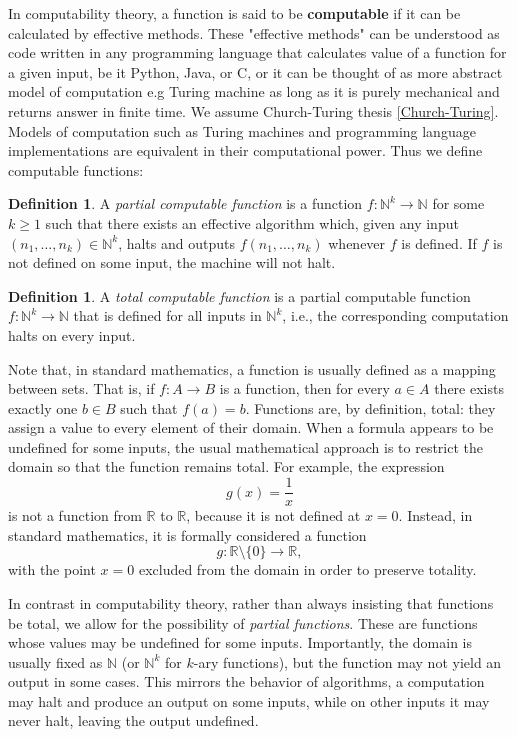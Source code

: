 \documentclass{pracalicmgr2025}
\theoremstyle{plain}            %
\theoremstyle{remark}           %
\theoremstyle{definition}       %
\newtheorem{definition}[theorem]{Definition}
\begin{document}
In computability theory, a function is said to be \textbf{computable} if it can be calculated by effective methods. These "effective methods" can be understood as code written in any programming language that calculates value of a function for a given input, be it Python, Java, or C, or it can be thought of as more abstract model of computation e.g Turing machine as long as it is purely mechanical and returns answer in finite time. We assume Church-Turing thesis \ref{Church-Turing}.  Models of computation such as Turing machines and programming language implementations are equivalent in their computational power. Thus we define computable functions:
\begin{definition}
    A \textit{partial computable function} is a function $f: \mathbb{N}^k \to \mathbb{N}$ for some $k \ge 1$ such that there exists an effective algorithm which, given any input $(n_1, \dots, n_k) \in \mathbb{N}^k$, halts and outputs $f(n_1, \dots, n_k)$ whenever $f$ is defined. If $f$ is not defined on some input, the machine will not halt.
\end{definition}
\begin{definition}
    A\textit{ total computable function} is a partial computable function $f: \mathbb{N}^k \to \mathbb{N}$ that is defined for all inputs in $\mathbb{N}^k$, i.e., the corresponding computation halts on every input.
\end{definition}

Note that, in standard mathematics, a function is usually defined as a mapping between sets. That is, if $f: A \to B$ is a function, then for every $a \in A$ there exists exactly one $b \in B$ such that $f(a) = b$. Functions are, by definition, total: they assign a value to every element of their domain. When a formula appears to be undefined for some inputs, the usual mathematical approach is to restrict the domain so that the function remains total. For example, the expression
$$
g(x) = \frac{1}{x}
$$
is not a function from $\mathbb{R}$ to $\mathbb{R}$, because it is not defined at $x = 0$. Instead, in standard mathematics, it is formally considered a function
$$
g: \mathbb{R} \setminus \{0\} \to \mathbb{R},
$$
with the point $x = 0$ excluded from the domain in order to preserve totality.

 In contrast in computability theory, rather than always insisting that functions be total, we allow for the possibility of \emph{partial functions}. These are functions whose values may be undefined for some inputs. Importantly, the domain is usually fixed as $\mathbb{N}$ (or $\mathbb{N}^k$ for $k$-ary functions), but the function may not yield an output in some cases. This mirrors the behavior of algorithms, a computation may halt and produce an output on some inputs, while on other inputs it may never halt, leaving the output undefined.
\end{document}
